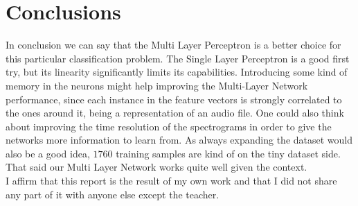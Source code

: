 \documentclass[10pt,a4paper]{report}
\begin{document}
\section{Conclusions}
In conclusion we can say that the Multi Layer Perceptron is a better choice for this particular classification problem. The Single Layer Perceptron is a good first try, but its linearity significantly limits its capabilities. Introducing some kind of memory in the neurons might help improving the Multi-Layer Network performance, since each instance in the feature vectors is strongly correlated to the ones around it, being a representation of an audio file. One could also think about improving the time resolution of the spectrograms in order to give the networks more information to learn from. As always expanding the dataset would also be a good idea, $1760$ training samples are kind of on the tiny dataset side. That said our Multi Layer Network works quite well given the context.
\vspace*{\fill}
\\
I affirm that this report is the result of my own work and that I did not share any part of it with anyone else except the teacher.
\\ \\ 
\end{document}
